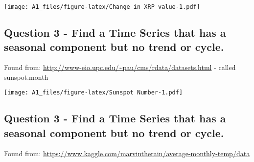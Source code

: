 \documentclass[
]{article}
\newenvironment{Shaded}{\begin{snugshade}}{\end{snugshade}}
\newcommand{\CommentTok}[1]{\textcolor[rgb]{0.56,0.35,0.01}{\textit{#1}}}
\newcommand{\DataTypeTok}[1]{\textcolor[rgb]{0.13,0.29,0.53}{#1}}
\newcommand{\DecValTok}[1]{\textcolor[rgb]{0.00,0.00,0.81}{#1}}
\newcommand{\KeywordTok}[1]{\textcolor[rgb]{0.13,0.29,0.53}{\textbf{#1}}}
\newcommand{\NormalTok}[1]{#1}
\newcommand{\OperatorTok}[1]{\textcolor[rgb]{0.81,0.36,0.00}{\textbf{#1}}}
\newcommand{\StringTok}[1]{\textcolor[rgb]{0.31,0.60,0.02}{#1}}
\begin{document}
\texttt{[image: A1\_files/figure-latex/Change in XRP value-1.pdf]}

\hypertarget{question-3---find-a-time-series-that-has-a-seasonal-component-but-no-trend-or-cycle.}{%
\subsection{Question 3 - Find a Time Series that has a seasonal
component but no trend or
cycle.}\label{question-3---find-a-time-series-that-has-a-seasonal-component-but-no-trend-or-cycle.}}

Found from: \url{http://www-eio.upc.edu/~pau/cms/rdata/datasets.html} -
called sunspot.month

\begin{Shaded}
\end{Shaded}

\texttt{[image: A1\_files/figure-latex/Sunspot Number-1.pdf]}

\hypertarget{question-3---find-a-time-series-that-has-a-seasonal-component-but-no-trend-or-cycle.-1}{%
\subsection{Question 3 - Find a Time Series that has a seasonal
component but no trend or
cycle.}\label{question-3---find-a-time-series-that-has-a-seasonal-component-but-no-trend-or-cycle.-1}}

Found from:
\url{https://www.kaggle.com/marvintherain/average-monthly-temp/data}
\end{document}
